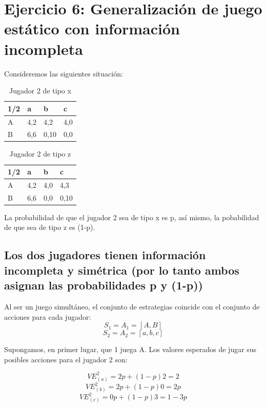 \documentclass{article}
\begin{document}
\section{Ejercicio 6: Generalizaci\'on de juego est\'atico con informaci\'on incompleta}
Consideremos las siguientes situaci\'on:
\begin{table}[htbp]
\begin{center}
\begin{tabular}{|l|l|l|l|}
\hline
1/2 & a & b & c \\
\hline \hline
A & 4,2 & 4,2 & 4,0 \\ \hline
B & 6,6 & 0,10 & 0,0 \\ \hline

\end{tabular}
\caption{Jugador 2 de tipo x}
\label{tabla:sencilla}
\end{center}
\end{table}

\begin{table}[htbp]
\begin{center}
\begin{tabular}{|l|l|l|l|}
\hline
1/2 & a & b & c \\
\hline \hline
A & 4,2 & 4,0 & 4,3 \\ \hline
B & 6,6 & 0,0 & 0,10 \\ \hline

\end{tabular}
\caption{Jugador 2 de tipo z}
\label{tabla:sencilla}
\end{center}
\end{table}



La probabilidad de que el jugador 2 sea de tipo x es p, as\'i mismo, la pobabilidad de que sea de tipo z es (1-p).


\subsection{Los dos jugadores tienen informaci\'on incompleta y sim\'etrica (por lo tanto ambos asignan las probabilidades p y (1-p))}

Al ser un juego simult\'aneo, el conjunto de estrategias coincide con el conjunto de acciones para cada jugador:
$$S_1=A_1=[A,B]$$
$$S_2=A_2=[a,b,c]$$

Supongamos, en primer lugar, que 1 juega A. Los valores esperados de jugar sus posibles acciones para el jugador 2 son:

$$VE^2_{(a)}=2p+(1-p)2=2$$
$$VE^2_{(b)}=2p+(1-p)0=2p$$
$$VE^2_{(c)}=0p+(1-p)3=1-3p$$
\end{document}
